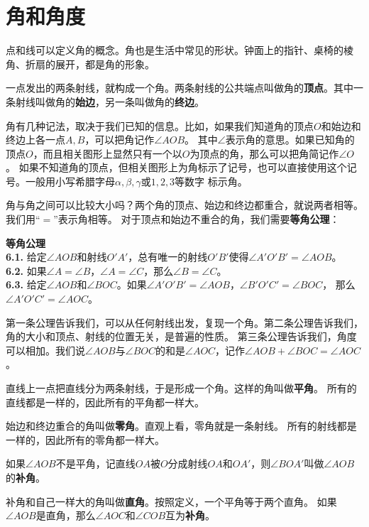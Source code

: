 \documentclass[12pt,UTF8]{ctexbook}
\begin{document}
\section{角和角度}
点和线可以定义角的概念。角也是生活中常见的形状。钟面上的指针、桌椅的棱角、折扇的展开，都是角的形象。

一点发出的两条射线，就构成一个角。两条射线的公共端点叫做角的\textbf{顶点}。其中一条射线叫做角的\textbf{始边}，另一条叫做角的\textbf{终边}。

角有几种记法，取决于我们已知的信息。比如，如果我们知道角的顶点$O$和始边和终边上各一点$A,B$，可以把角记作$\angle AOB$。
其中$\angle$表示角的意思。如果已知角的顶点$O$，而且相关图形上显然只有一个以$O$为顶点的角，那么可以把角简记作$\angle O$。
如果不知道角的顶点，但相关图形上为角标示了记号，也可以直接使用这个记号。一般用小写希腊字母$\alpha, \beta, \gamma$或$1,2,3$等数字
标示角。

角与角之间可以比较大小吗？两个角的顶点、始边和终边都重合，就说两者相等。我们用“$=$”表示角相等。
对于顶点和始边不重合的角，我们需要\textbf{等角公理}：
\begin{po}{\textbf{等角公理}}\label{po:5}
    \mbox{}\\
    \indent \textbf{6.1.} 给定$\angle AOB$和射线$O'A'$，总有唯一的射线$O'B'$使得$\angle A'O'B' = \angle AOB$。\\
    \indent \textbf{6.2.} 如果$\angle A = \angle B$，$\angle A = \angle C$，那么$\angle B = \angle C$。\\
    \indent \textbf{6.3.} 给定$\angle AOB$和$\angle BOC$。如果$\angle A'O'B' = \angle AOB$，$\angle B'O'C' = \angle BOC$，
    那么$\angle A'O'C' = \angle AOC$。
\end{po}
第一条公理告诉我们，可以从任何射线出发，复现一个角。第二条公理告诉我们，角的大小和顶点、射线的位置无关，是普遍的性质。
第三条公理告诉我们，角度可以相加。我们说$\angle AOB$与$\angle BOC$的和是$\angle AOC$，记作$\angle AOB + \angle BOC = \angle AOC$。

直线上一点把直线分为两条射线，于是形成一个角。这样的角叫做\textbf{平角}。
所有的直线都是一样的，因此所有的平角都一样大。

始边和终边重合的角叫做\textbf{零角}。直观上看，零角就是一条射线。
所有的射线都是一样的，因此所有的零角都一样大。

如果$\angle AOB$不是平角，记直线$OA$被$O$分成射线$OA$和$OA'$，则$\angle BOA'$叫做$\angle AOB$的\textbf{补角}。

补角和自己一样大的角叫做\textbf{直角}。按照定义，一个平角等于两个直角。
如果$\angle AOB$是直角，那么$\angle AOC$和$\angle COB$互为\textbf{补角}。
\end{document}
